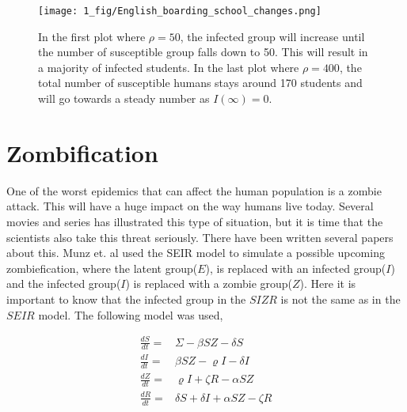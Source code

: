\documentclass[%
twoside,                 %
final,                   %
chapterprefix=true,      %
open=right               %
10pt]{book}
\begin{document}
\begin{figure}[ht]
  \centerline{\texttt{[image: 1\_fig/English\_boarding\_school\_changes.png]}}
  \caption{
  \label{fig:rho_changes} In the first plot where $\rho=50$, the infected group will increase until the number of susceptible group falls down to 50. This will result in a majority of infected students. In the last plot where $\rho=400$, the total number of susceptible humans stays around 170 students and will go towards a steady number as $I(\infty)=0$.
  }
\end{figure}


\section{Zombification}
\label{section:1_zombiefication}
One of the worst epidemics that can affect the human population is a zombie attack. This will have a huge impact on the way humans live today. Several movies and series has illustrated this type of situation, but it is time that the scientists also take this threat seriously. There have been written several papers about this. Munz et. al\cite{munz2009zombies} used the SEIR model to simulate a possible upcoming zombiefication, where the latent group($E$), is replaced with an infected group($I$) and the infected group($I$) is replaced with a zombie group($Z$). Here it is important to know that the infected group in the $SIZR$ is not the same as in the $SEIR$ model. The following model was used,

\begin{align*}
\frac{dS}{dt} =& \Sigma -\beta SZ - \delta S \\
\frac{dI}{dt} =& \beta SZ - \varrho I - \delta I\\
\frac{dZ}{dt} =& \varrho I + \zeta R - \alpha SZ\\
\frac{dR}{dt} =& \delta S + \delta I + \alpha SZ - \zeta R
\end{align*}
\end{document}
